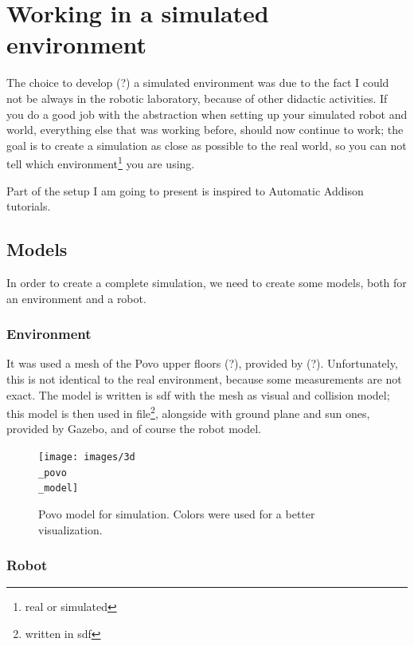 \chapter{Working in a simulated environment}

The choice to develop (?) a simulated environment was due to the fact I could not be always in the robotic laboratory, because of other didactic activities. If you do a good job with the abstraction when setting up your simulated robot and world, everything else that was working before, should now continue to work; the goal is to create a simulation as close as possible to the real world, so you can not tell which environment\footnote{real or simulated} you are using.

Part of the setup I am going to present is inspired to Automatic Addison tutorials\cite{tutorials}.

\section{Models}

In order to create a complete simulation, we need to create some models, both for an environment and a robot.

\subsection{Environment}

It was used a mesh of the Povo upper floors (?), provided by (?). Unfortunately, this is not identical to the real environment, because some measurements are not exact.
The model is written is \acrfull{sdf} with the mesh as visual and collision model; this model is then used in  file\footnote{written in \acrshort{sdf}}, alongside with ground plane and sun ones, provided by Gazebo, and of course the robot model.

\begin{figure}[h]
    \centering
    \texttt{[image: images/3d\\\_povo\\\_model]}
    \caption{Povo model for simulation. Colors were used for a better visualization.}
\end{figure}

\newpage

\subsection{Robot}

